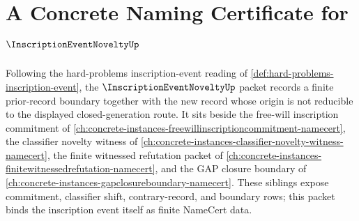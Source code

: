\chapter{A Concrete Naming Certificate for $\InscriptionEventNoveltyUp$}
\label{ch:concrete-instances-inscription-event-novelty-namecert}

Following the hard-problems inscription-event reading of \autoref{def:hard-problems-inscription-event}, the $\InscriptionEventNoveltyUp$ packet records a finite prior-record boundary together with the new record whose origin is not reducible to the displayed closed-generation route. It sits beside the free-will inscription commitment of \autoref{ch:concrete-instances-freewillinscriptioncommitment-namecert}, the classifier novelty witness of \autoref{ch:concrete-instances-classifier-novelty-witness-namecert}, the finite witnessed refutation packet of \autoref{ch:concrete-instances-finitewitnessedrefutation-namecert}, and the GAP closure boundary of \autoref{ch:concrete-instances-gapclosureboundary-namecert}. These siblings expose commitment, classifier shift, contrary-record, and boundary rows; this packet binds the inscription event itself as finite NameCert data.

